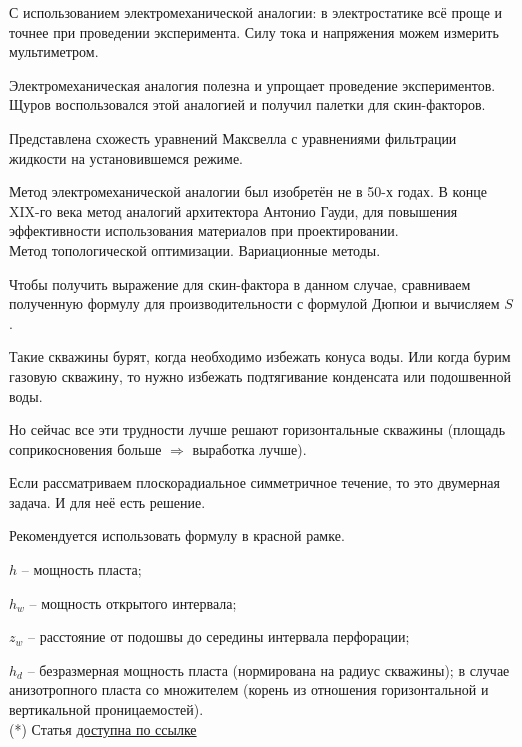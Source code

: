 \documentclass[main.tex]{subfiles}
\begin{document}
С использованием электромеханической аналогии: в электростатике всё проще и точнее при проведении эксперимента. Силу тока и напряжения можем измерить мультиметром.

Электромеханическая аналогия полезна и упрощает проведение экспериментов. Щуров воспользовался этой аналогией и получил палетки для скин-факторов.


Представлена схожесть уравнений Максвелла с уравнениями фильтрации жидкости на установившемся режиме.


Метод электромеханической аналогии был изобретён не в 50-х годах. В конце XIX-го века метод аналогий архитектора Антонио Гауди, для повышения эффективности использования материалов при проектировании.\\

Метод топологической оптимизации. Вариационные методы.


Чтобы получить выражение для скин-фактора в данном случае, сравниваем полученную формулу для производительности с формулой Дюпюи и вычисляем $S$.

Такие скважины бурят, когда необходимо избежать конуса воды. Или когда бурим газовую скважину, то нужно избежать подтягивание конденсата или подошвенной воды.

Но сейчас все эти трудности лучше решают горизонтальные скважины (площадь соприкосновения больше $\Rightarrow$ выработка лучше).


Если рассматриваем плоскорадиальное симметричное течение, то это двумерная задача. И для неё есть решение.

Рекомендуется использовать формулу в красной рамке.

$h$ -- мощность пласта;

$h_w$ -- мощность открытого интервала;

$z_w$ -- расстояние от подошвы до середины интервала перфорации;

$h_d$ -- безразмерная мощность пласта (нормирована на радиус скважины); в случае анизотропного пласта со множителем (корень из отношения горизонтальной и вертикальной проницаемостей).\\

(*) Статья \href{https://mualal.github.io/source/tex/hydrocarbons2022/articles/papatzacos1987.pdf}{доступна по ссылке}
\end{document}
